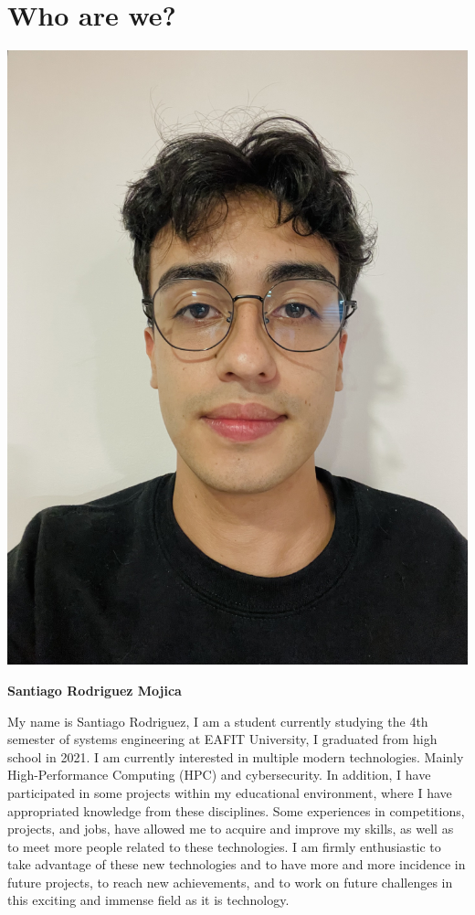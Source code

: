 \documentclass[11pt,a4paper,twocolumn]{article}
\begin{document}
    \setlength{\parindent}{4em}



    \section{Who are we?}
    \begin{center}
        \includegraphics[width = .45\linewidth]{Images/Santiago Rodriguez.jpeg}
    \end{center}
    \begin{center}
        \textbf{Santiago Rodriguez Mojica}
    \end{center}
    My name is Santiago Rodriguez, I am a student currently studying the 4th semester of systems engineering at EAFIT University, I graduated from high school in 2021. I am currently interested in multiple modern technologies. Mainly High-Performance Computing (HPC) and cybersecurity. In addition, I have participated in some projects within my educational environment, where I have appropriated knowledge from these disciplines. Some experiences in competitions, projects, and jobs, have allowed me to acquire and improve my skills, as well as to meet more people related to these technologies. I am firmly enthusiastic to take advantage of these new technologies and to have more and more incidence in future projects, to reach new achievements, and to work on future challenges in this exciting and immense field as it is technology.
\end{document}
